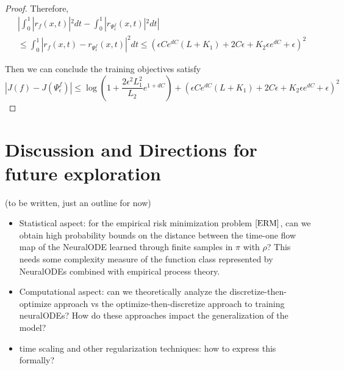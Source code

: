 \begin{proof}
Therefore, 
\begin{align*}
&|\int_0^1|r_f(x,t)|^2dt - \int_0^1|r_{ \Psi_\epsilon^f}(x,t)|^2dt| \\
&\leq \int_0^1 |r_f(x,t) - r_{ \Psi_\epsilon^f}(x,t)|^2dt \leq \left(\epsilon Ce^{dC}(L+ K_1) + 2C\epsilon + K_2\epsilon e^{dC} + \epsilon\right)^2   
\end{align*}

Then we can conclude the training objectives satisfy
$$|J(f) - J(\Psi^f_\epsilon)| \leq \log\left(1+\frac{2\epsilon^2L_1^2}{L_2}e^{1 + dC} \right) + \left(\epsilon Ce^{dC}(L+ K_1) + 2C\epsilon + K_2\epsilon e^{dC} + \epsilon\right)^2   $$





\end{proof}


















\section{Discussion and Directions for future exploration}
(to be written, just an outline for now)
\begin{itemize}
    \item Statistical aspect: for the empirical risk minimization problem $\ref{ERM}$, can we obtain high probability bounds on the distance between the time-one flow map of the NeuralODE learned through finite samples in $\pi$ with $\rho$? This needs some complexity measure of the function class represented by NeuralODEs combined with empirical process theory.
    
    \item Computational aspect: can we theoretically analyze the discretize-then-optimize approach vs the optimize-then-discretize approach to training neuralODEs? How do these approaches impact the generalization of the model? 
    
    
    
    \item time scaling and other regularization techniques: how to express this formally?
\end{itemize}





















